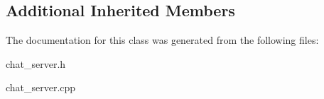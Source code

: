 \subsection*{Additional Inherited Members}


The documentation for this class was generated from the following files\+:\begin{DoxyCompactItemize}
\item 
chat\+\_\+server.\+h\item 
chat\+\_\+server.\+cpp\end{DoxyCompactItemize}
